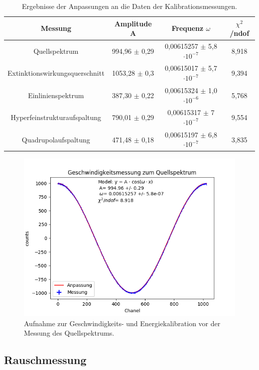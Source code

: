 \documentclass[12pt,a4paper]{article}
\begin{document}
\begin{table}
\centering
\begin{tabular}{|c|c|c|c|}
\hline 
Messung & Amplitude A & Frequenz $\omega$ & $\chi ^2$/ndof \\ 
\hline 
Quellspektrum & 994,96 $\pm$ 0,29 & 0,00615257 $\pm$ 5,8 $\cdot 10^{-7}$ & 8,918 \\
\hline 
Extinktionswirkungsquerschnitt & 1053,28 $\pm$ 0,3 & 0,00615017 $\pm$ 5,7 $\cdot 10^{-7}$ & 9,394  \\
\hline 
Einlinienspektrum & 387,30 $\pm$ 0,22 & 0,00615324 $\pm$ 1,0 $\cdot 10^{-6}$ & 5,768  \\
\hline 
Hyperfeinstrukturaufspaltung & 790,01 $\pm$ 0,29 & 0,00615317 $\pm$ 7 $\cdot 10^{-7}$ & 9,554  \\
\hline 
Quadrupolaufspaltung & 471,48 $\pm$ 0,18 & 0,00615197 $\pm$ 6,8 $\cdot 10^{-7}$ & 3,835 \\
\hline 
\end{tabular} 
\caption{Ergebnisse der Anpassungen an die Daten der Kalibrationsmessungen.}
\label{tab:Kalibration_Fitergebnisse}
\end{table}

\begin{figure}
\centering
\includegraphics[scale=0.8]{Bilder/Kalibration/Quellspektrum.png}
\caption{Aufnahme zur Geschwindigkeits- und Energiekalibration vor der Messung des Quellspektrums.}
\label{fig:Kalibration_Beispiel}
\end{figure}

\subsection{Rauschmessung}
\end{document}
